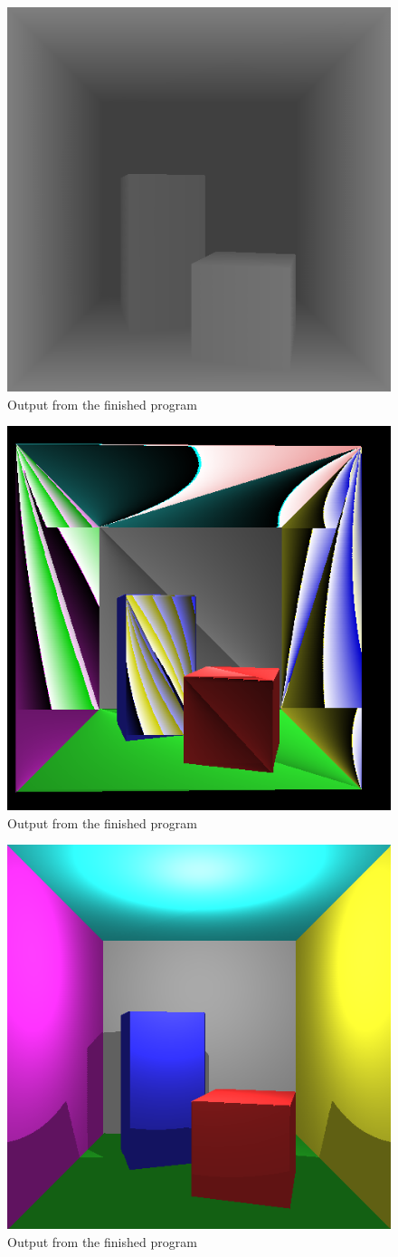 \documentclass[a4paper,11pt]{article}
\begin{document}
\begin{figure}[h!]
	\centering	
	\includegraphics[width=0.45\linewidth]{screenshotz.png}
	\caption{Output from the finished program}
	\label{fig5}
\end{figure}

\begin{figure}[h!]
	\centering	
	\includegraphics[width=0.45\linewidth]{fun.png}
	\caption{Output from the finished program}
	\label{fig5}
\end{figure}
\begin{figure}[h!]
	\centering	
	\includegraphics[width=0.45\linewidth]{shadows.png}
	\caption{Output from the finished program}
	\label{fig5}
\end{figure}
\end{document}
